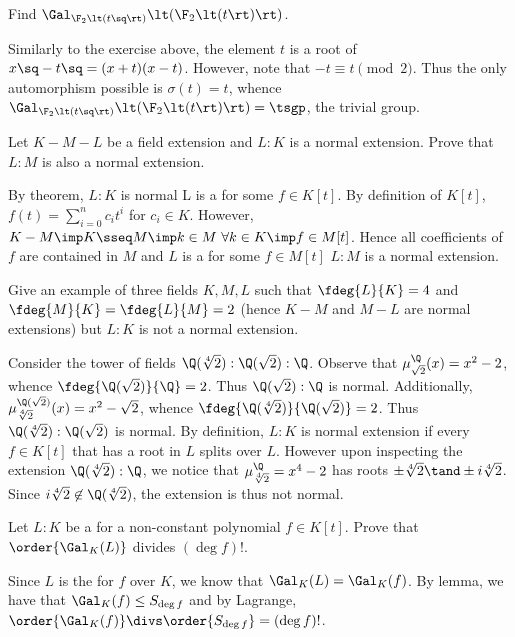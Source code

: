 \documentclass{article}
\begin{document}
\begin{subexercise}
  Find $ \Gal_{\F_2\lt(t\sq\rt)}\lt(\F_2\lt(t\rt)\rt) $.
\end{subexercise}
\begin{solution}
  Similarly to the exercise above, the element $ t $ is a root of $ x\sq-t\sq = (x+t)(x-t) $.
  However, note that $ -t \equiv t \pmod 2 $.
  Thus the only automorphism possible is $ \sigma(t) = t $, whence $ \Gal_{\F_2\lt(t\sq\rt)}\lt(\F_2\lt(t\rt)\rt) = \tsgp $, the trivial group.
\end{solution}

\begin{subexercise}
  Let $K - M - L$ be a field extension and $ L:K $ is a normal extension.
  Prove that $L:M$ is also a normal extension.
\end{subexercise}
\begin{solution}
By theorem, $ L:K $ is normal \iff L is a \sf for some $ f\in K[t] $.
By definition of $ K[t] $, $ f(t)=\sum\limits_{i=0}^n c_it^i $ for $ c_i\in K $.
However, $ K-M\imp K\sseq M \imp k\in M \ \forall k\in K \imp f\in M[t]$.
Hence all coefficients of $ f $ are contained in $ M $ and $ L $ is a \sf for some $ f\in M[t] $ \iff $ L:M $ is a normal extension.
\end{solution}

\begin{subexercise}
  Give an example of three fields $K, M, L$ such that $\fdeg{L}{K} = 4$ and $ \fdeg{M}{K} = \fdeg{L}{M} = 2 $ (hence $ K-M $ and $ M-L $ are normal extensions) but $L : K$ is not a normal extension.
\end{subexercise}
\begin{solution}
Consider the tower of fields $ \Q(\sqrt[4]2):\Q(\sqrt 2):\Q $.
Observe that $ \mu_{\sqrt 2}^\Q(x) = x^2-2 $, whence $ \fdeg{\Q(\sqrt 2)}{\Q} = 2 $.
Thus $ \Q(\sqrt 2):\Q $ is normal.
Additionally, $ \mu_{\sqrt[4] 2}^{\Q(\sqrt 2)}(x) = x^2-\sqrt 2 $, whence $ \fdeg{\Q(\sqrt[4] 2)}{\Q(\sqrt 2)} = 2 $.
Thus $ \Q(\sqrt[4] 2):\Q(\sqrt 2) $ is normal.
By definition, $ L:K $ is normal extension if every $ f\in K[t] $ that has a root in $ L $ splits over $ L $.
However upon inspecting the extension $ \Q(\sqrt[4]2):\Q $, we notice that $ \mu_{\sqrt[4]2}^\Q = x^4-2 $ has roots $ \pm\sqrt[4]2 \tand \pm i\sqrt[4]2 $.
Since $ i\sqrt[4]2 \not\in \Q(\sqrt[4]2) $, the extension is thus not normal.
\end{solution}

\begin{bexercise}
  Let $ L:K $ be a \sfe for a non-constant polynomial $ f\in K[t] $.
  Prove that $ \order{\Gal_K(L)} $ divides $ (\deg f)! $.
\end{bexercise}
\begin{solution}
  Since $ L $ is the \sfe for $ f $ over $ K $, we know that $ \Gal_K(L) = \Gal_K(f) $.
  By lemma, we have that $ \Gal_K(f)\leq S_{\deg f} $ and by Lagrange, $ \order{\Gal_K(f)} \divs \order{S_{\deg f}}=(\deg f)! $.
\end{solution}
\end{document}
